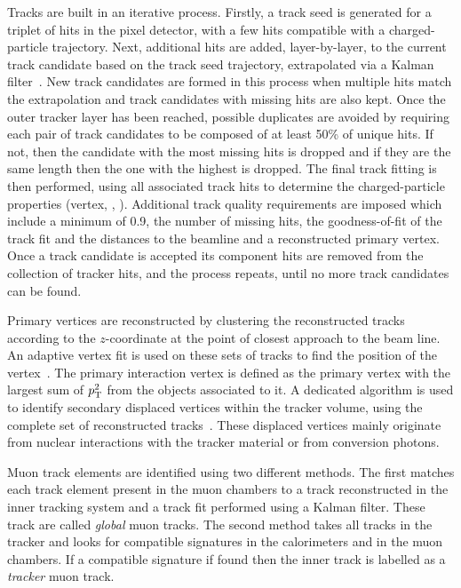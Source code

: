 Tracks are built in an iterative process.
Firstly, a track seed is generated for a triplet of hits in the pixel detector, with a few hits compatible with a charged-particle trajectory.
Next, additional hits are added, layer-by-layer, to the current track candidate based on the track seed trajectory, extrapolated via a Kalman filter~\cite{Event:KF}.
New track candidates are formed in this process when multiple hits match the extrapolation and track candidates with missing hits are also kept.
Once the outer tracker layer has been reached, possible duplicates are avoided by requiring each pair of track candidates to be composed of at least 50\% of unique hits.
If not, then the candidate with the most missing hits is dropped and if they are the same length then the one with the highest \chisq{} is dropped.
The final track fitting is then performed, using all associated track hits to determine the charged-particle properties (vertex, \pt{}, \etc{}).
Additional track quality requirements are imposed which include a minimum \pt{} of 0.9\GeV{}, the number of missing hits, the goodness-of-fit \chisq{} of the track fit and the distances to the beamline and a reconstructed primary vertex.
Once a track candidate is accepted its component hits are removed from the collection of tracker hits, and the process repeats, until no more track candidates can be found.

Primary vertices are reconstructed by clustering the reconstructed tracks according to the $z$-coordinate at the point of closest approach to the beam line.
An adaptive vertex fit is used on these sets of tracks to find the position of the vertex~\cite{Event:VertexFitting}.
The primary interaction vertex is defined as the primary vertex with the largest sum of $p_{\mathrm{T}}^{2}$ from the objects associated to it.
A dedicated algorithm is used to identify secondary displaced vertices within the tracker volume, using the complete set of reconstructed tracks~\cite{Event:SecondaryVertex1,Event:SecondaryVertex2}.
These displaced vertices mainly originate from nuclear interactions with the tracker material or from conversion photons.

Muon track elements are identified using two different methods.
The first matches each track element present in the muon chambers to a track reconstructed in the inner tracking system and a track fit performed using a Kalman filter.
These track are called \textit{global} muon tracks.
The second method takes all tracks in the tracker and looks for compatible signatures in the calorimeters and in the muon chambers. 
If a compatible signature if found then the inner track is labelled as a \textit{tracker} muon track.

